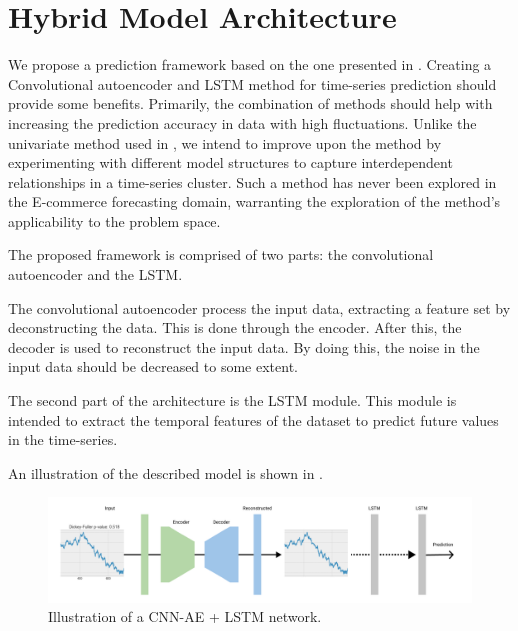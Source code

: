 \section{Hybrid Model Architecture}
\label{section:Architecture:Model}

We propose a prediction framework based on the one presented in \cite{Zhao2019}.
Creating a Convolutional autoencoder and LSTM method for time-series prediction should provide some benefits.
Primarily, the combination of methods should help with increasing the prediction accuracy in data with high fluctuations.
Unlike the univariate method used in \cite{Zhao2019},
we intend to improve upon the method by experimenting with different model structures to capture interdependent relationships in a time-series cluster.
Such a method has never been explored in the E-commerce forecasting domain, warranting the exploration of the method's applicability to the problem space.

The proposed framework is comprised of two parts: the convolutional autoencoder and the LSTM.

The convolutional autoencoder process the input data, extracting a feature set by deconstructing the data.
This is done through the encoder. After this, the decoder is used to reconstruct the input data.
By doing this, the noise in the input data should be decreased to some extent.

The second part of the architecture is the LSTM module.
This module is intended to extract the temporal features of the dataset
to predict future values in the time-series.

An illustration of the described model is shown in .

\begin{figure}[h!]
  \centering
  \includegraphics[width=\textwidth]{./figs/illustrations/CNN-AE-LSTM.png}
  \hfill
  \caption{Illustration of a CNN-AE + LSTM network.}
  \label{fig:cnn-ae+lstm-network}
\end{figure}


